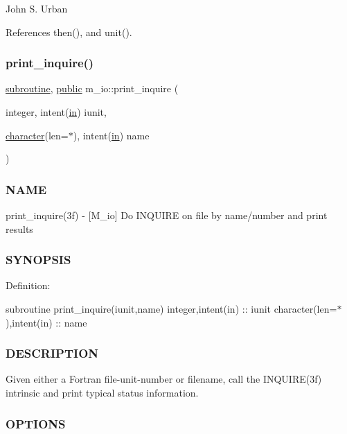 John S. Urban 

References then(), and unit().

\mbox{\label{namespacem__io_aa6ee277b2e0f1c263488624b34371fcf}} 
\subsubsection{\texorpdfstring{print\+\_\+inquire()}{print\_inquire()}}
{\footnotesize\ttfamily \hyperlink{M__stopwatch_83_8txt_acfbcff50169d691ff02d4a123ed70482}{subroutine}, \hyperlink{M__stopwatch_83_8txt_a2f74811300c361e53b430611a7d1769f}{public} m\+\_\+io\+::print\+\_\+inquire (\begin{DoxyParamCaption}\item[{integer, intent(\hyperlink{M__journal_83_8txt_afce72651d1eed785a2132bee863b2f38}{in})}]{iunit,  }\item[{\hyperlink{option__stopwatch_83_8txt_abd4b21fbbd175834027b5224bfe97e66}{character}(len=$\ast$), intent(\hyperlink{M__journal_83_8txt_afce72651d1eed785a2132bee863b2f38}{in})}]{name }\end{DoxyParamCaption})}



\subsubsection*{N\+A\+ME}

print\+\_\+inquire(3f) -\/ \mbox{[}M\+\_\+io\mbox{]} Do I\+N\+Q\+U\+I\+RE on file by name/number and print results \subsubsection*{S\+Y\+N\+O\+P\+S\+IS}

Definition\+:

subroutine print\+\_\+inquire(iunit,name) integer,intent(in) \+:\+: iunit character(len=$\ast$),intent(in) \+:\+: name \subsubsection*{D\+E\+S\+C\+R\+I\+P\+T\+I\+ON}

Given either a Fortran file-\/unit-\/number or filename, call the I\+N\+Q\+U\+I\+R\+E(3f) intrinsic and print typical status information. \subsubsection*{O\+P\+T\+I\+O\+NS}

